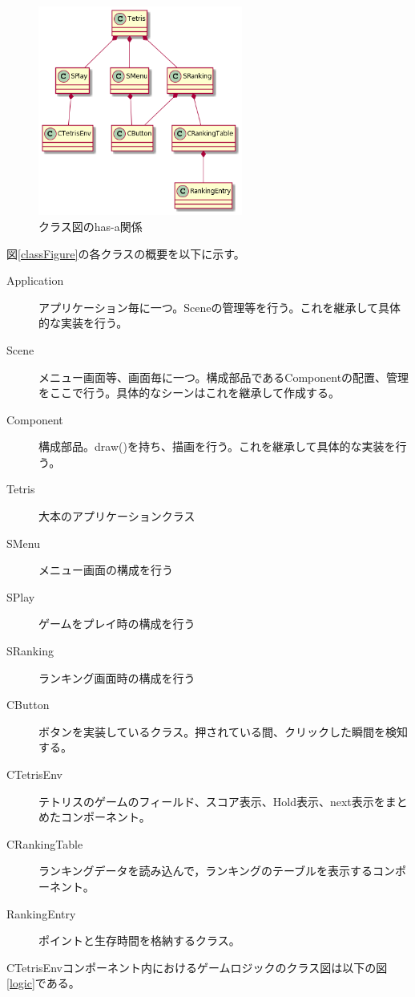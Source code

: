 \documentclass[a4paper,11pt]{jsarticle}
\begin{document}
\begin{figure}[H]
\begin{center}
\includegraphics[width=0.6\textwidth]{class2.png}
\caption{クラス図のhas-a関係}
\label{classFigure2}
\end{center}
\end{figure}

図\ref{classFigure}の各クラスの概要を以下に示す。
\begin{description}
  \item[Application] アプリケーション毎に一つ。Sceneの管理等を行う。これを継承して具体的な実装を行う。
  \item[Scene] メニュー画面等、画面毎に一つ。構成部品であるComponentの配置、管理をここで行う。具体的なシーンはこれを継承して作成する。
  \item[Component] 構成部品。draw()を持ち、描画を行う。これを継承して具体的な実装を行う。  
  \item[Tetris] 大本のアプリケーションクラス
  \item[SMenu] メニュー画面の構成を行う
  \item[SPlay] ゲームをプレイ時の構成を行う
  \item[SRanking] ランキング画面時の構成を行う
  \item[CButton] ボタンを実装しているクラス。押されている間、クリックした瞬間を検知する。  
  \item[CTetrisEnv] テトリスのゲームのフィールド、スコア表示、Hold表示、next表示をまとめたコンポーネント。
  \item[CRankingTable] ランキングデータを読み込んで，ランキングのテーブルを表示するコンポーネント。
  \item[RankingEntry] ポイントと生存時間を格納するクラス。
  
\end{description}
\clearpage
CTetrisEnvコンポーネント内におけるゲームロジックのクラス図は以下の図\ref{logic}である。
\end{document}
